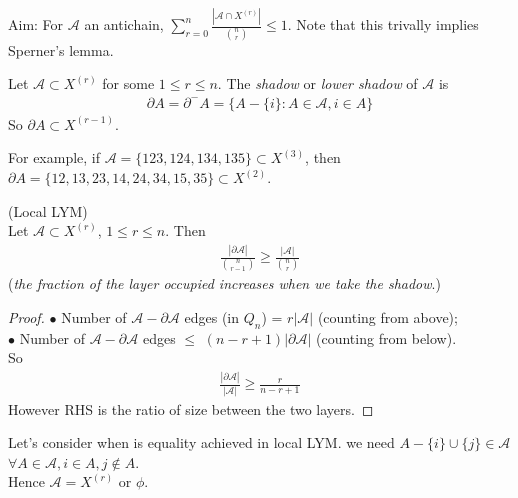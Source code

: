 \documentclass[a4paper]{article}
\begin{document}
Aim: For $\mathcal{A}$ an antichain, $\sum_{r=0}^n \frac{|\mathcal{A} \cap X^{(r)}|}{{n \choose r}} \leq 1$. Note that this trivally implies Sperner's lemma.

Let $\mathcal{A} \subset X^{(r)}$ for some $1 \leq r \leq n$. The \emph{shadow} or \emph{lower shadow} of $\mathcal{A}$ is
\begin{equation*}
    \begin{aligned}
        \partial A = \partial^- A = \{A-\{i\}:A \in \mathcal{A},i \in A\}
    \end{aligned}
\end{equation*}
So $\partial A \subset X^{(r-1)}$.

For example, if $\mathcal{A} = \{123,124,134,135\} \subset X^{(3)}$, then $\partial A =\{12,13,23,14,24,34,15,35\} \subset X^{(2)}$.

\begin{lemma} (Local LYM)\\
    Let $\mathcal{A} \subset X^{(r)}$, $1 \leq r \leq n$. Then 
    \begin{equation*}
        \begin{aligned}
            \frac{|\partial \mathcal{A}|}{{n \choose {r-1}}} \geq \frac{|\mathcal{A}|}{{n \choose r}}
        \end{aligned}
    \end{equation*}
    (\emph{the fraction of the layer occupied increases when we take the shadow}.)
    \begin{proof}
        $\bullet$ Number of $\mathcal{A}-\partial\mathcal{A}$ edges (in $Q_n$) = $r|\mathcal{A}|$ (counting from above);\\
        $\bullet$ Number of $\mathcal{A}-\partial\mathcal{A}$ edges $\leq$ $(n-r+1)|\partial \mathcal{A}|$ (counting from below).\\
        So
        \begin{equation*}
        \begin{aligned}
            \frac{|\partial \mathcal{A}|}{|\mathcal{A}|} \geq \frac{r}{n-r+1}
        \end{aligned}
        \end{equation*}
        However RHS is the ratio of size between the two layers.
    \end{proof}
\end{lemma}
Let's consider when is equality achieved in local LYM. we need $A-\{i\} \cup \{j\} \in \mathcal{A}$ $\forall A \in \mathcal{A}, i \in A, j \not\in A$.\\
Hence $\mathcal{A} = X^{(r)}$ or $\phi$.
\end{document}
